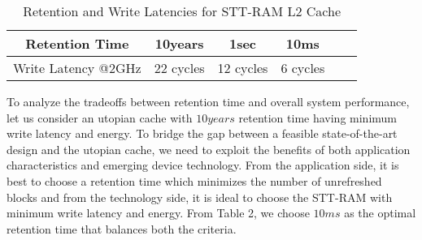 

\begin{table}[t]
  \centering
   \singlespacing
  \caption{Retention and Write Latencies for STT-RAM L2 Cache}
  \label{table:rt-wt}
  
  \begin{tabular}{| c | c | c | c | c | c |}
    \hline
     Retention Time & 10years & 1sec &10ms \\
    \hline
    Write Latency @2GHz & 22 cycles & 12 cycles & 6 cycles \\
    \hline
  \end{tabular}
\end{table}

To analyze the tradeoffs between retention time and overall system performance, let us consider an utopian cache
with $10years$ retention time having minimum write latency and energy.  To bridge the gap between a
feasible state-of-the-art design and the utopian cache, we need to exploit the benefits of both application
characteristics and emerging device technology. From the application side, it is best to choose a retention time
which minimizes the number of unrefreshed blocks and from the technology side, it is ideal to choose the
STT-RAM with minimum write latency and energy. From Table 2, we choose $10ms$ as the optimal retention time that
balances both the criteria.
